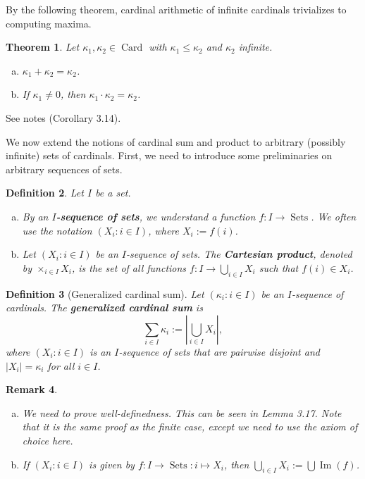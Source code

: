 \documentclass[10pt]{article}
\makeatletter
\DeclareMathOperator{\im}{Im}
\DeclareMathOperator{\Sets}{Sets}
\DeclareMathOperator{\Card}{Card}
\theoremstyle{newstyle}
\newtheorem{thm}{Theorem}[section]
\newtheorem{remark}[thm]{Remark}
\newtheorem{defn}[thm]{Definition}
\newenvironment{pf}[1][\proofname]{\par
  \pushQED{\qed}%
  \normalfont \topsep0\p@\relax
  \trivlist
  \item[\hskip\labelsep\scshape
  #1\@addpunct{.}]\ignorespaces
}{%
  \popQED\endtrivlist\@endpefalse
}
\makeatother
\begin{document}
By the following theorem, cardinal arithmetic of infinite cardinals trivializes to computing maxima.

\begin{thm} Let $\kappa_1, \kappa_2 \in \Card$ with $\kappa_1 \leq \kappa_2$ and 
$\kappa_2$ infinite.
\begin{enumerate}[(a)]
    \item $\kappa_1 + \kappa_2 = \kappa_2$. 
    \item If $\kappa_1 \neq 0$, then $\kappa_1 \cdot \kappa_2 = \kappa_2$.
\end{enumerate}
\end{thm}
\begin{pf}
See notes (Corollary 3.14).
\end{pf}

We now extend the notions of cardinal sum and product to arbitrary (possibly infinite) sets of 
cardinals. First, we need to introduce some preliminaries on arbitrary sequences of sets. 

\begin{defn} Let $I$ be a set. 
\begin{enumerate}[(a)]
    \item By an {\bf $I$-sequence of sets}, we understand a function 
    $f : I \to \Sets$. We often use the notation 
    $(X_i : i \in I)$, where $X_i := f(i)$.
    \item Let $(X_i : i \in I)$ be an $I$-sequence of sets. The {\bf Cartesian product}, 
    denoted by $\times_{i\in I} X_i$, is the set of all functions $f : 
    I \to \bigcup_{i\in I} X_i$ such that $f(i) \in X_i$. 
\end{enumerate}
\end{defn}

\begin{defn}[Generalized cardinal sum] 
Let $(\kappa_i : i \in I)$ be an $I$-sequence of cardinals. The {\bf generalized cardinal 
sum} is 
\[ \sum_{i\in I} \kappa_i := \left| \bigcup_{i \in I} X_i \right|, \]
where $(X_i : i \in I)$ is an $I$-sequence of sets that are pairwise disjoint and $|X_i| = \kappa_i$
for all $i \in I$.
\end{defn}

\begin{remark}~
\begin{enumerate}[(a)]
    \item We need to prove well-definedness. This can be seen in Lemma 3.17. Note that 
    it is the same proof as the finite case, except we need to use the axiom of choice here.
    \item If $(X_i : i \in I)$ is given by $f : I \to \Sets : i \mapsto X_i$, then 
    $\bigcup_{i\in I} X_i := \bigcup \im(f)$.
\end{enumerate}
\end{remark}
\end{document}
